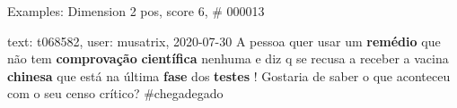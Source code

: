 \begin{frame}{Examples: Dimension 2 pos, score 6, \# 000013}
\footnotesize
\begin{exampleblock}{text: t068582, user: musatrix, 2020-07-30}
A pessoa quer usar um \textbf{remédio} que não tem \textbf{comprovação} 
\textbf{científica} nenhuma e diz q se recusa a receber a vacina 
\textbf{chinesa} que está na última \textbf{fase} dos \textbf{testes} ! 
Gostaria de saber o que aconteceu com o seu censo crítico? \#chegadegado 
\end{exampleblock}
\end{frame}
